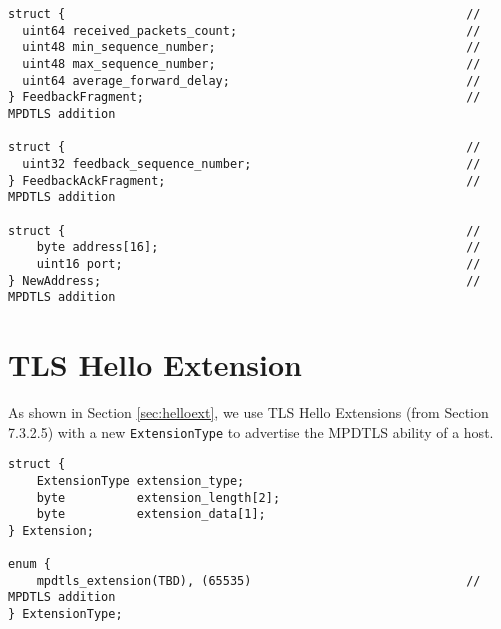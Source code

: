 \begin{lstlisting}
struct {                                                        //
  uint64 received_packets_count;                                //
  uint48 min_sequence_number;                                   //
  uint48 max_sequence_number;                                   //
  uint64 average_forward_delay;                                 //
} FeedbackFragment;                                             // MPDTLS addition

struct {                                                        //
  uint32 feedback_sequence_number;                              //
} FeedbackAckFragment;                                          // MPDTLS addition

struct {                                                        //
    byte address[16];                                           //
    uint16 port;                                                //
} NewAddress;                                                   // MPDTLS addition
\end{lstlisting}

\section{TLS Hello Extension}

As shown in Section \ref{sec:helloext}, we use TLS Hello Extensions \cite{draft-tls13}(from Section 7.3.2.5) with a new \texttt{ExtensionType} to advertise the MPDTLS ability of a host.

\begin{lstlisting} 
struct {
    ExtensionType extension_type;
    byte          extension_length[2];
    byte          extension_data[1];
} Extension;

enum {
    mpdtls_extension(TBD), (65535)                              // MPDTLS addition
} ExtensionType;
\end{lstlisting}
